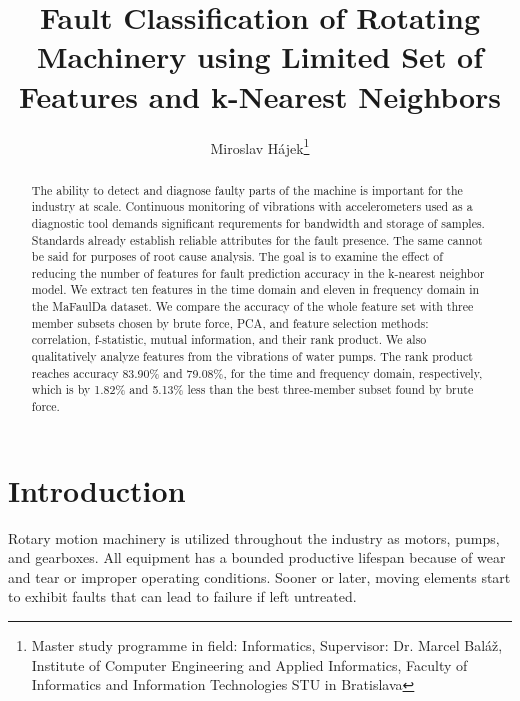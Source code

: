 \documentclass{llncs}
\begin{document}
\title{Fault Classification of Rotating Machinery using Limited Set of Features and k-Nearest Neighbors}

\author{
	Miroslav Hájek\thanks{Master study programme in field: Informatics,
	Supervisor: Dr. Marcel Baláž, Institute of Computer Engineering and Applied Informatics, Faculty of Informatics and Information Technologies STU in Bratislava}
}


\maketitle

\begin{abstract}
The ability to detect and diagnose faulty parts of the machine is important for the industry at scale. Continuous monitoring of vibrations  with accelerometers used as a diagnostic tool demands significant requrements for bandwidth and storage of samples. Standards already establish reliable attributes for the fault presence. The same cannot be said for purposes of root cause analysis. The goal is to examine the effect of reducing the number of features for fault prediction accuracy in the k-nearest neighbor model. We extract ten features in the time domain and eleven in frequency domain in the MaFaulDa dataset. We compare the accuracy of the whole feature set with three member subsets chosen by brute force, PCA, and feature selection methods: correlation, f-statistic, mutual information, and their rank product. We also qualitatively analyze features from the vibrations of water pumps. The rank product reaches accuracy 83.90\% and 79.08\%, for the time and frequency domain, respectively, which is by 1.82\% and 5.13\% less than the best three-member subset found by brute force.

\end{abstract}


\section{Introduction}
Rotary motion machinery is utilized throughout the industry as motors, pumps, and gearboxes. All equipment has a bounded productive lifespan because of wear and tear or improper operating conditions. Sooner or later, moving elements start to exhibit faults that can lead to failure if left untreated. 
\end{document}
